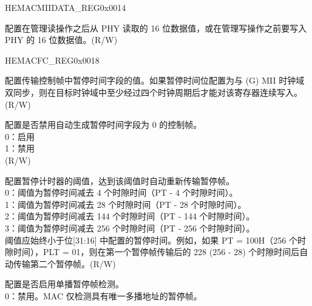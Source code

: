 \begin{register}{H}{EMACMIIDATA\_REG}{0x0014}\label{regdesc:EMACMIIDATAREG}
%
%
\regnewline%
\begin{regdesc}\begin{reglist}
\item [MII\_DATA] 配置在管理读操作之后从 PHY 读取的 16 位数据值，或在管理写操作之前要写入 PHY 的 16 位数据值。(R/W)
\end{reglist}\end{regdesc}
\end{register}

\begin{register}{H}{EMACFC\_REG}{0x0018}\label{regdesc:EMACFLOWCONTROLREG}
%
%
%
%
%
%
%
%
%
\regnewline%
\begin{regdesc}\begin{reglist}
\item [PAUSE\_TIME] 配置传输控制帧中暂停时间字段的值。如果暂停时间位配置为与 (G) MII 时钟域双同步，则在目标时钟域中至少经过四个时钟周期后才能对该寄存器连续写入。(R/W)
\item [DZPQ] 配置是否禁用自动生成暂停时间字段为 0 的控制帧。\\
0：启用\\
1：禁用\\(R/W)
\item [PLT] 配置暂停计时器的阈值，达到该阈值时自动重新传输暂停帧。\\
0：阈值为暂停时间减去 4 个时隙时间（PT - 4 个时隙时间）。\\
1：阈值为暂停时间减去 28 个时隙时间（PT - 28 个时隙时间）。\\
2：阈值为暂停时间减去 144 个时隙时间（PT - 144 个时隙时间）。\\
3：阈值为暂停时间减去 256 个时隙时间（PT - 256 个时隙时间）。\\
阈值应始终小于位[31:16] 中配置的暂停时间。例如，如果 PT = 100H（256 个时隙时间），PLT = 01，则在第一个暂停帧传输后的 228 (256 - 28) 个时隙时间后自动传输第二个暂停帧。(R/W)
\item [UPFD] 配置是否启用单播暂停帧检测。\\
0：禁用。MAC 仅检测具有唯一多播地址的暂停帧。\\

\end{reglist}
\end{regdesc}
\end{register}
